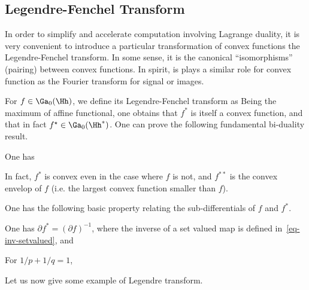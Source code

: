 \subsection{Legendre-Fenchel Transform}

In order to simplify and accelerate computation involving Lagrange duality, it is very convenient to introduce a particular transformation of convex functions the Legendre-Fenchel transform. In some sense, it is the canonical ``isomorphisms'' (pairing) between convex functions. In spirit, is plays a similar role for convex function as the Fourier transform for signal or images. 

For $f \in \Ga_0(\Hh)$, we define its Legendre-Fenchel transform as
Being the maximum of affine functional, one obtains that $f^*$ is itself a convex function, and that in fact $f^\star \in \Ga_0(\Hh^*)$. One can prove the following fundamental bi-duality result.

\begin{thm}
One has
\end{thm}

In fact, $f^*$ is convex even in the case where $f$ is not, and $f^{**}$ is the convex envelop of $f$ (i.e. the largest convex function smaller than $f$). 


One has the following basic property relating the sub-differentials of $f$ and $f^*$.

\begin{prop}
One has $\partial f^* = (\partial f)^{-1}$, where the inverse of a set valued map is defined in~\eqref{eq-inv-setvalued}, and 
\end{prop}

\begin{prop}\label{prop-dual-lp}
	For $1/p+1/q=1$, 
\end{prop}


Let us now give some example of Legendre transform. 

